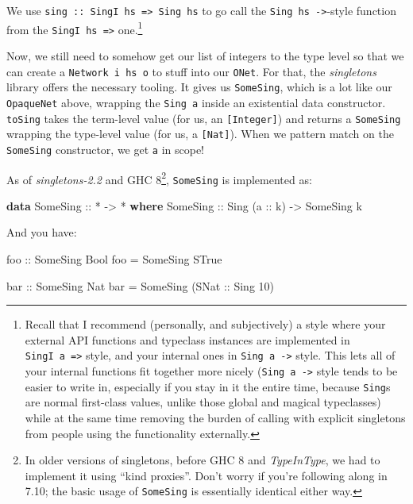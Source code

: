 \documentclass[]{article}
\newenvironment{Shaded}{}{}
\newcommand{\KeywordTok}[1]{\textcolor[rgb]{0.00,0.44,0.13}{\textbf{{#1}}}}
\newcommand{\DataTypeTok}[1]{\textcolor[rgb]{0.56,0.13,0.00}{{#1}}}
\newcommand{\DecValTok}[1]{\textcolor[rgb]{0.25,0.63,0.44}{{#1}}}
\newcommand{\OtherTok}[1]{\textcolor[rgb]{0.00,0.44,0.13}{{#1}}}
\newcommand{\FunctionTok}[1]{\textcolor[rgb]{0.02,0.16,0.49}{{#1}}}
\newcommand{\NormalTok}[1]{{#1}}
\begin{document}
We use \texttt{sing\ ::\ SingI\ hs\ =\textgreater{}\ Sing\ hs} to go call the
\texttt{Sing\ hs\ -\textgreater{}}-style function from the
\texttt{SingI\ hs\ =\textgreater{}} one.\footnote{Recall that I recommend
  (personally, and subjectively) a style where your external API functions and
  typeclass instances are implemented in \texttt{SingI\ a\ =\textgreater{}}
  style, and your internal ones in \texttt{Sing\ a\ -\textgreater{}} style. This
  lets all of your internal functions fit together more nicely
  (\texttt{Sing\ a\ -\textgreater{}} style tends to be easier to write in,
  especially if you stay in it the entire time, because \texttt{Sing}s are
  normal first-class values, unlike those global and magical typeclasses) while
  at the same time removing the burden of calling with explicit singletons from
  people using the functionality externally.}

Now, we still need to somehow get our list of integers to the type level so that
we can create a \texttt{Network\ i\ hs\ o} to stuff into our \texttt{ONet}. For
that, the \emph{singletons} library offers the necessary tooling. It gives us
\texttt{SomeSing}, which is a lot like our \texttt{OpaqueNet} above, wrapping
the \texttt{Sing\ a} inside an existential data constructor. \texttt{toSing}
takes the term-level value (for us, an \texttt{{[}Integer{]}}) and returns a
\texttt{SomeSing} wrapping the type-level value (for us, a \texttt{{[}Nat{]}}).
When we pattern match on the \texttt{SomeSing} constructor, we get \texttt{a} in
scope!

As of \emph{singletons-2.2} and GHC 8\footnote{In older versions of singletons,
  before GHC 8 and \emph{TypeInType}, we had to implement it using ``kind
  proxies''. Don't worry if you're following along in 7.10; the basic usage of
  \texttt{SomeSing} is essentially identical either way.}, \texttt{SomeSing} is
implemented as:

\begin{Shaded}
\begin{Highlighting}[]
\KeywordTok{data} \DataTypeTok{SomeSing}\OtherTok{ ::} \FunctionTok{*} \OtherTok{->} \FunctionTok{*} \KeywordTok{where}
    \DataTypeTok{SomeSing}\OtherTok{ ::} \DataTypeTok{Sing} \NormalTok{(}\OtherTok{a ::} \NormalTok{k) }\OtherTok{->} \DataTypeTok{SomeSing} \NormalTok{k}
\end{Highlighting}
\end{Shaded}

And you have:

\begin{Shaded}
\begin{Highlighting}[]
\OtherTok{foo ::} \DataTypeTok{SomeSing} \DataTypeTok{Bool}
\NormalTok{foo }\FunctionTok{=} \DataTypeTok{SomeSing} \DataTypeTok{STrue}

\OtherTok{bar ::} \DataTypeTok{SomeSing} \DataTypeTok{Nat}
\NormalTok{bar }\FunctionTok{=} \DataTypeTok{SomeSing} \NormalTok{(}\DataTypeTok{SNat}\OtherTok{ ::} \DataTypeTok{Sing} \DecValTok{10}\NormalTok{)}
\end{Highlighting}
\end{Shaded}
\end{document}
